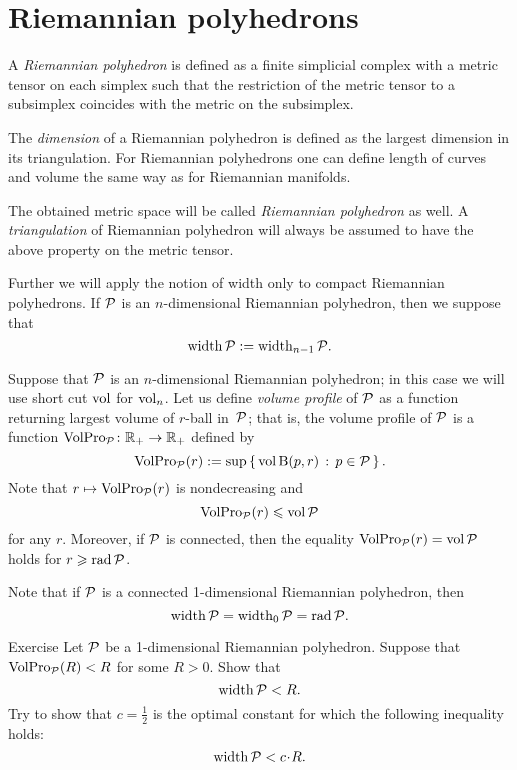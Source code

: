 \section{Riemannian polyhedrons}

A \emph{Riemannian polyhedron} is defined as a finite simplicial complex with a metric tensor on each simplex such that the restriction of the metric tensor to a subsimplex coincides with the metric on the subsimplex.

The {}\emph{dimension} of a Riemannian polyhedron is defined as the largest dimension in its triangulation.
For Riemannian polyhedrons one can define length of curves and volume the same way as for Riemannian manifolds.

The obtained metric space will be called \emph{Riemannian polyhedron} as well.
A \emph{triangulation} of Riemannian polyhedron  will always be assumed to have the above property on the metric tensor.

Further we will apply the notion of width only to compact Riemannian polyhedrons.
If $\mathcal{P}$ is an $n$-dimensional Riemannian polyhedron, then 
we suppose that
\[\operatorname{\rm width}\nolimits\mathcal{P}\mathrel{:=}\operatorname{\rm width}\nolimits_{n-1}\mathcal{P}.\]


Suppose that $\mathcal{P}$ is an $n$-dimensional Riemannian polyhedron;
in this case we will use short cut $\operatorname{\rm vol}\nolimits$ for $\operatorname{\rm vol}\nolimits_n$.
Let us define \emph{volume profile} of $\mathcal{P}$ as a function 
returning largest volume of $r$-ball in~$\mathcal{P}$;
that is, the volume profile of $\mathcal{P}$ is a function $\operatorname{\rm VolPro}\nolimits_{\mathcal{P}}\colon\mathbb{R}_+\to\mathbb{R}_+$ defined by 
\[\operatorname{\rm VolPro}\nolimits_{\mathcal{P}}(r)\mathrel{:=} \sup\left\{\,{\operatorname{\rm vol}\nolimits \mathrm{B}{}(p,r)}\,:\,{p\in\mathcal{P}}\,\right\}.\]
Note that 
$r\mapsto \operatorname{\rm VolPro}\nolimits_{\mathcal{P}}(r)$ is nondecreasing  and
\[\operatorname{\rm VolPro}\nolimits_{\mathcal{P}}(r)\leqslant\operatorname{\rm vol}\nolimits\mathcal{P}\]
for any $r$.
Moreover, if $\mathcal{P}$ is connected, then the equality $\VolPro_{\spc{P}}(r)\z=\vol\spc{P}$ holds
for $r\geqslant \mathop{\rm rad}\nolimits \mathcal{P}$.

Note that if $\mathcal{P}$ is a connected 1-dimensional Riemannian polyhedron, then 
\[\operatorname{\rm width}\nolimits\mathcal{P}=\operatorname{\rm width}\nolimits_0\mathcal{P}=\mathop{\rm rad}\nolimits\mathcal{P}.\]

\begin{thm}{Exercise}\label{ex:1D-case}
Let $\mathcal{P}$ be a 1-dimensional Riemannian polyhedron.
Suppose that $\operatorname{\rm VolPro}\nolimits_{\mathcal{P}}(R)<R$ for some $R>0$.
Show that 
\[\operatorname{\rm width}\nolimits \mathcal{P}<R.\]
Try to show that $c=\tfrac 12$ is the optimal constant for which the following inequality holds: 
\[\width \spc{P}<c\cdot R.\]
\end{thm}

